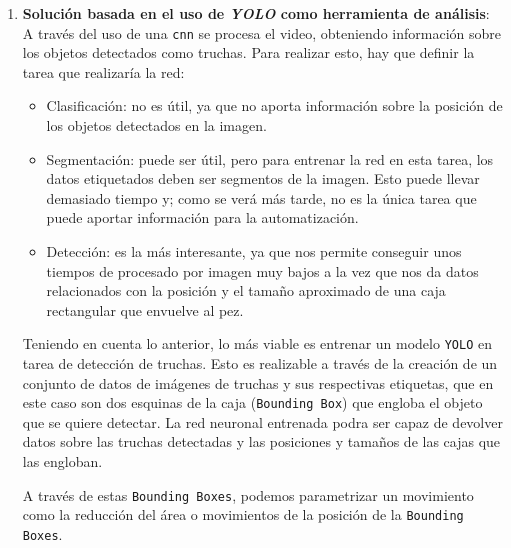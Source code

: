 \begin{enumerate}
    \item \textbf{Solución basada en el uso de \textit{YOLO} como herramienta de análisis}: A través del uso de una \texttt{\acrshort{cnn}} 
    se procesa el video, obteniendo información sobre los objetos detectados como truchas.\newline
    Para realizar esto, hay que definir la tarea que realizaría la red:
    \begin{itemize}
        \item Clasificación: no es útil, ya que no aporta información sobre la posición de los objetos detectados en la imagen.
        \item Segmentación: puede ser útil, pero para entrenar la red en esta tarea, los datos etiquetados deben ser segmentos de la imagen. 
        Esto puede llevar demasiado tiempo y; como se verá más tarde, no es la única tarea que puede aportar información para la automatización.
        \item Detección: es la más interesante, ya que nos permite conseguir unos tiempos de procesado por imagen muy bajos a la vez que nos da datos 
        relacionados con la posición y el tamaño aproximado de una caja rectangular que envuelve al pez.
    \end{itemize}
    
    Teniendo en cuenta lo anterior, lo más viable es entrenar un modelo \texttt{YOLO} en tarea de detección de truchas. Esto es realizable a través de la creación 
    de un conjunto de datos de imágenes de truchas y sus respectivas etiquetas, que en este caso son dos esquinas de la caja (\texttt{Bounding Box}) que engloba el 
    objeto que se quiere detectar.\newline
    La red neuronal entrenada podra ser capaz de devolver datos sobre las truchas detectadas y las posiciones y tamaños de las cajas que las engloban.
    
    A través de estas \texttt{Bounding Boxes}, podemos parametrizar un movimiento como la reducción del área o movimientos de la posición de la \texttt{Bounding Boxes}.


\end{enumerate}
